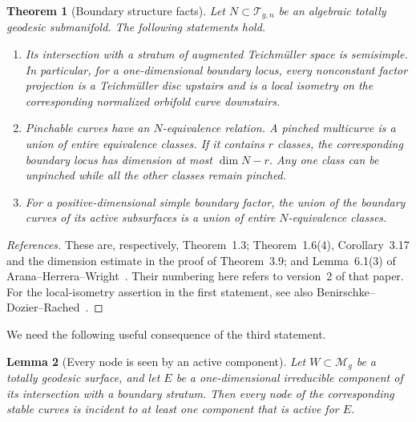 \documentclass[11pt]{article}
\newcommand{\M}{\mathcal M}
\newcommand{\T}{\mathcal T}
\newtheorem{theorem}{Theorem}[section]
\newtheorem{lemma}[theorem]{Lemma}
\theoremstyle{remark}
\begin{document}
\begin{theorem}[Boundary structure facts]\label{thm:structure}
Let \(N\subset\T_{g,n}\) be an algebraic totally geodesic submanifold.
The following statements hold.
\begin{enumerate}
\item
Its intersection with a stratum of augmented Teichm\"uller space
is semisimple. In particular, for a one-dimensional boundary
locus, every nonconstant factor projection is a Teichm\"uller
disc upstairs and is a local isometry on the corresponding
normalized orbifold curve downstairs.

\item
Pinchable curves have an \(N\)-equivalence relation. A pinched
multicurve is a union of entire equivalence classes. If it
contains \(r\) classes, the corresponding boundary locus has
dimension at most \(\dim N-r\). Any one class can be unpinched
while all the other classes remain pinched.

\item
For a positive-dimensional simple boundary factor, the union of
the boundary curves of its active subsurfaces is a union of
entire \(N\)-equivalence classes.
\end{enumerate}
\end{theorem}

\begin{proof}[References]
These are, respectively, Theorem~1.3; Theorem~1.6(4),
Corollary~3.17 and the dimension estimate in the proof of
Theorem~3.9; and Lemma~6.1(3) of
Arana--Herrera--Wright~\cite{AHW}. Their numbering here refers
to version~2 of that paper.
For the local-isometry assertion in the first statement, see also
Benirschke--Dozier--Rached~\cite[Theorem~1.7 and
Proposition~9.2]{BDR}.
\end{proof}


We need the following useful consequence of the third statement.

\begin{lemma}[Every node is seen by an active component]\label{lem:active}
Let \(W\subset\M_g\) be a totally geodesic surface, and let \(E\)
be a one-dimensional irreducible component of its intersection
with a boundary stratum. Then every node of the corresponding
stable curves is incident to at least one component that is
active for \(E\).
\end{lemma}
\end{document}
